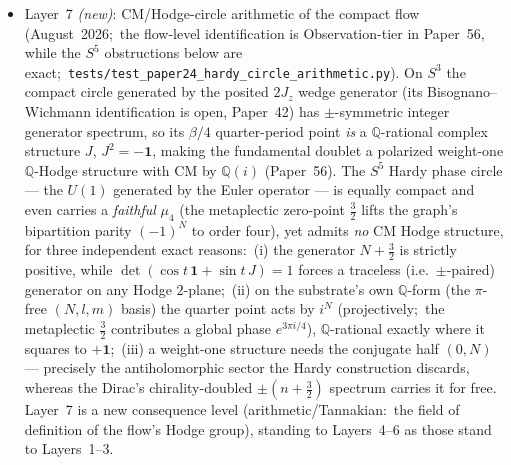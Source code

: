 \documentclass[twocolumn,pra,amsmath,amssymb,superscriptaddress]{revtex4-2}
\begin{document}
\begin{itemize}
  exhibits a bit-exact $\mathbb{Z}/2$ chirality-parity factorization
  (Sprint~Q5'-CH-1):\ plain trace vanishes identically at odd $k$,
  supertrace vanishes identically at even $k$.  On the
  Bargmann--Segal Hardy sector at every finite $N_{\max}$ this rule
  fails on both load-bearing structural conditions:\ the Hardy
  spectrum is strictly positive (no $\pm$-partner) and no
  half-integer-weight chirality grading exists on the $(N, 0)$
  tower (the \emph{angular} weight;\ the zero-point $\tfrac32$ is a
  different, metaplectic half-integer --- see the Layer-7 companion
  note below).  This propagates the Coulomb/HO asymmetry from the
  wedge-generator level (Layer~4) and the spectral-action level
  (Layer~5) to the master Mellin engine level, naming a
  CH-substrate-specific structural prerequisite for the cosmic-Galois
  $U^*$ enrichment program (Paper~55~\S~subsec:open\_m2\_m3).
\item Layer~7 \emph{(new)}: CM/Hodge-circle arithmetic of the compact
  flow (August~2026;\ the flow-level identification is Observation-tier in
  Paper~56, while the $S^5$ obstructions below are exact;\
  \texttt{tests/test\_paper24\_hardy\_circle\_arithmetic.py}).  On
  $S^3$ the compact circle generated by the posited $2J_z$ wedge
  generator (its Bisognano--Wichmann identification is open,
  Paper~42) has $\pm$-symmetric integer generator spectrum, so its $\beta/4$
  quarter-period point \emph{is} a $\mathbb{Q}$-rational complex structure
  $J$, $J^2=-\mathbf 1$, making the fundamental doublet a polarized
  weight-one $\mathbb{Q}$-Hodge structure with CM by $\mathbb{Q}(i)$ (Paper~56).  The
  $S^5$ Hardy phase circle --- the $U(1)$ generated by the Euler
  operator --- is equally compact and even carries a \emph{faithful}
  $\mu_4$ (the metaplectic zero-point $\tfrac32$ lifts the graph's
  bipartition parity $(-1)^N$ to order four), yet admits \emph{no} CM
  Hodge structure, for three independent exact reasons:\ (i) the
  generator $N+\tfrac32$ is strictly positive, while
  $\det(\cos t\,\mathbf 1+\sin t\,J)=1$ forces a traceless (i.e.\
  $\pm$-paired) generator on any Hodge $2$-plane;\ (ii) on the
  substrate's own $\mathbb{Q}$-form (the $\pi$-free $(N,l,m)$ basis) the
  quarter point acts by $i^N$ (projectively;\ the metaplectic $\tfrac32$
  contributes a global phase $e^{3\pi i/4}$), $\mathbb{Q}$-rational exactly where it squares
  to $+\mathbf 1$;\ (iii) a weight-one structure needs the conjugate
  half $(0,N)$ --- precisely the antiholomorphic sector the Hardy
  construction discards, whereas the Dirac's chirality-doubled
  $\pm(n+\tfrac32)$ spectrum carries it for free.  Layer~7 is a new
  consequence level (arithmetic/Tannakian:\ the field of definition
  of the flow's Hodge group), standing to Layers~4--6 as those stand
  to Layers~1--3.
\end{itemize}
\end{document}
